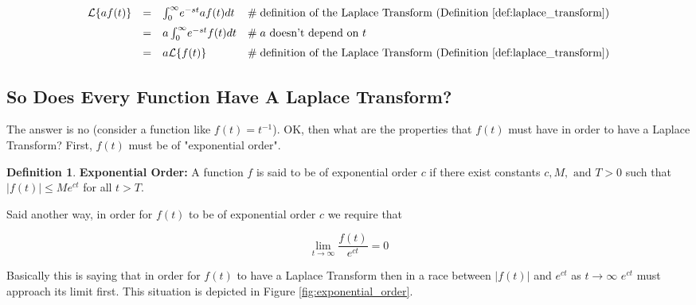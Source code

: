 \documentclass{article}
\theoremstyle{definition}
\newtheorem{definition}{Definition}[section]
\begin{document}
\begin{equation*}
\begin{array}{lllll}
\mathcal{L}\{af(t)\} 
&=& \int_0^\infty \! e^{-st} a f(t) dt                 & \mathrel{\#} \text{definition of the Laplace Transform (Definition \ref{def:laplace_transform})}   \\  
[6pt]                                                              %
&=& a \int_0^\infty \! e^{-st} f(t) dt                 & \mathrel{\#} \text{$a$ doesn't depend on $t$}                                                                              \\  
[6pt]                                                              %
&=& a \mathcal{L}\{f(t)\}                               & \mathrel{\#} \text{definition of the Laplace Transform  (Definition \ref{def:laplace_transform})}
\end{array}
\end{equation*}


\smallskip
\subsection{So Does Every Function Have A Laplace Transform?}
The answer is no (consider a function like $f(t) = t^{-1}$). OK, then what are the properties that $f(t)$ must have in order to have a Laplace Transform? First, $f(t)$ must
be of "exponential order". 


\bigskip
\begin{definition} 
{\bf Exponential Order:} A function $f$ is said to be of exponential order $c$ if there exist constants $c, M, \text{ and } T > 0$ such that $|f(t)| \leq Me^{ct}$ for all $t > T$.
\label{def:exponential_order}
\end{definition}

\bigskip
\noindent
Said another way, in order for $f(t)$ to be of exponential order $c$ we require that  

\bigskip
\begin{equation*}
\lim\limits_{t \to \infty} \frac{f(t)}{e^{ct}} = 0
\end{equation*}

\medskip
\bigskip
\noindent
Basically this is saying that in order for $f(t)$ to have a Laplace Transform then in a race between $|f(t)|$ and $e^{ct}$ as $t \to \infty$ $e^{ct}$ must
approach its limit first. This situation is depicted in Figure \ref{fig:exponential_order}.
\end{document}

